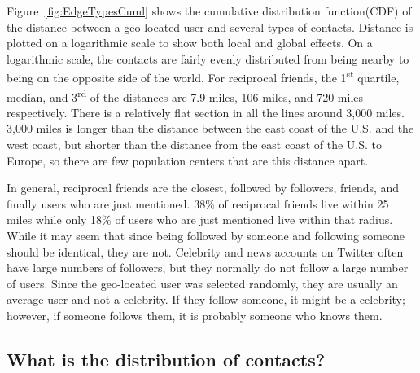 Figure~\ref{fig:EdgeTypesCuml} shows the cumulative distribution
function(CDF) of the distance between a geo-located user and several types of
contacts.
%
Distance is plotted on a logarithmic scale to show both local and
global effects.
%
On a logarithmic scale, the contacts are fairly evenly distributed from being
nearby to being on the opposite side of the world.
%
For reciprocal friends, the 1\textsuperscript{st} quartile, median, and
3\textsuperscript{rd} of the distances are 7.9 miles, 106 miles, and 720 miles
respectively.
%
There is a relatively flat section in all the lines around 3,000 miles.
%
3,000 miles is longer than the distance between the east coast of the U.S. and the west coast, but shorter than the distance from the east coast of the U.S. to Europe, so there are few population centers that are this distance apart.

In general, reciprocal friends are the closest, followed by followers, friends,
and finally users who are just mentioned.
%
38\% of reciprocal friends live within 25 miles while only 18\% of users
who are just mentioned live within that radius.
%
While it may seem that since being followed by someone and following someone
should be identical, they are not.
%
Celebrity and news accounts on Twitter often have large numbers of followers,
but they normally do not follow a large number of users.
%
Since the geo-located user was selected randomly, they are usually an average
user and not a celebrity.
%
If they follow someone, it might be a celebrity; however, if someone follows
them, it is probably someone who knows them.

\subsection{What is the distribution of contacts?}

